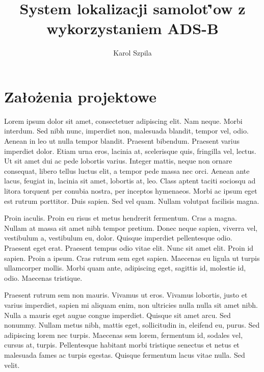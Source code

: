 \documentclass[eng,printmode]{mgr}
\title{System lokalizacji samolot\.'ow z wykorzystaniem ADS-B}
\author{Karol Szpila}
\begin{document}

\maketitle %

\tableofcontents %

\chapter{Za\l{}o\.zenia projektowe}
Lorem ipsum dolor sit amet, consectetuer adipiscing elit. Nam neque. Morbi interdum. Sed nibh nunc, imperdiet non, malesuada blandit, tempor vel, odio. Aenean in leo ut nulla tempor blandit. Praesent bibendum. Praesent varius imperdiet dolor. Etiam urna eros, lacinia at, scelerisque quis, fringilla vel, lectus. Ut sit amet dui ac pede lobortis varius. Integer mattis, neque non ornare consequat, libero tellus luctus elit, a tempor pede massa nec orci. Aenean ante lacus, feugiat in, lacinia sit amet, lobortis at, leo. Class aptent taciti sociosqu ad litora torquent per conubia nostra, per inceptos hymenaeos. Morbi ac ipsum eget est rutrum porttitor. Duis sapien. Sed vel quam. Nullam volutpat facilisis magna. 

Proin iaculis. Proin eu risus et metus hendrerit fermentum. Cras a magna. Nullam at massa sit amet nibh tempor pretium. Donec neque sapien, viverra vel, vestibulum a, vestibulum eu, dolor. Quisque imperdiet pellentesque odio. Praesent eget erat. Praesent tempus odio vitae elit. Nunc sit amet elit. Proin id sapien. Proin a ipsum. Cras rutrum sem eget sapien. Maecenas eu ligula ut turpis ullamcorper mollis. Morbi quam ante, adipiscing eget, sagittis id, molestie id, odio. Maecenas tristique. 

Praesent rutrum sem non mauris. Vivamus ut eros. Vivamus lobortis, justo et varius imperdiet, sapien mi aliquam enim, non ultricies nulla nulla sit amet nibh. Nulla a mauris eget augue congue imperdiet. Quisque sit amet arcu. Sed nonummy. Nullam metus nibh, mattis eget, sollicitudin in, eleifend eu, purus. Sed adipiscing lorem nec turpis. Maecenas sem lorem, fermentum id, sodales vel, cursus at, turpis. Pellentesque habitant morbi tristique senectus et netus et malesuada fames ac turpis egestas. Quisque fermentum lacus vitae nulla. Sed velit. 
\end{document}
